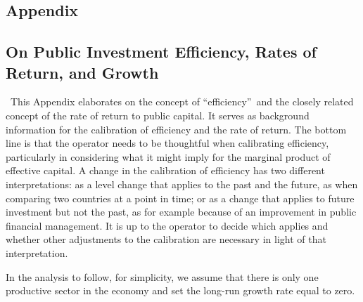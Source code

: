 \documentclass[11pt]{article}
\begin{document}
\begin{appendix}%

\section*{Appendix}

\subsection{On Public Investment Efficiency, Rates of Return, and Growth}

\quad\ \thinspace This Appendix elaborates on the concept of
\textquotedblleft efficiency\textquotedblright\ and the closely related
concept of the rate of return to public capital. It serves as background
information for the calibration of efficiency and the rate of return. The
bottom line is that the operator needs to be thoughtful when calibrating
efficiency, particularly in considering what it might imply for the marginal
product of effective capital. A change in the calibration of efficiency has
two different interpretations: as a level change that applies to the past
and the future, as when comparing two countries at a point in time; or as a
change that applies to future investment but not the past, as for example
because of an improvement in public financial management. It is up to the
operator to decide which applies and whether other adjustments to the
calibration are necessary in light of that interpretation.

In the analysis to follow, for simplicity, we assume that there is only one
productive sector in the economy and set the long-run growth rate equal to
zero.


\end{appendix}
\end{document}
